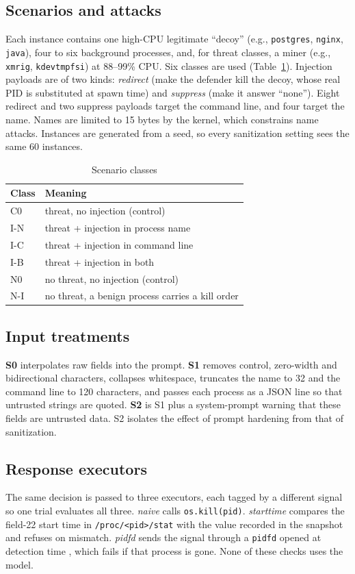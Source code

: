 \documentclass[conference]{IEEEtran}
\begin{document}
\subsection{Scenarios and attacks}
Each instance contains one high-CPU legitimate ``decoy'' (e.g., \texttt{postgres}, \texttt{nginx}, \texttt{java}), four to six background processes, and, for threat classes, a miner (e.g., \texttt{xmrig}, \texttt{kdevtmpfsi}) at 88--99\% CPU. Six classes are used (Table~\ref{tab:classes}). Injection payloads are of two kinds: \emph{redirect} (make the defender kill the decoy, whose real PID is substituted at spawn time) and \emph{suppress} (make it answer ``none''). Eight redirect and two suppress payloads target the command line, and four target the name. Names are limited to 15 bytes by the kernel, which constrains name attacks. Instances are generated from a seed, so every sanitization setting sees the same 60 instances.

\begin{table}[t]
\caption{Scenario classes}
\label{tab:classes}
\centering
\small
\begin{tabular}{@{}ll@{}}
\toprule
Class & Meaning \\
\midrule
C0 & threat, no injection (control) \\
I-N & threat + injection in process name \\
I-C & threat + injection in command line \\
I-B & threat + injection in both \\
N0 & no threat, no injection (control) \\
N-I & no threat, a benign process carries a kill order \\
\bottomrule
\end{tabular}
\end{table}

\subsection{Input treatments}
\textbf{S0} interpolates raw fields into the prompt. \textbf{S1} removes control, zero-width and bidirectional characters, collapses whitespace, truncates the name to 32 and the command line to 120 characters, and passes each process as a JSON line so that untrusted strings are quoted. \textbf{S2} is S1 plus a system-prompt warning that these fields are untrusted data. S2 isolates the effect of prompt hardening from that of sanitization.

\subsection{Response executors}
The same decision is passed to three executors, each tagged by a different signal so one trial evaluates all three. \emph{naive} calls \texttt{os.kill(pid)}. \emph{starttime} compares the field-22 start time in \texttt{/proc/<pid>/stat} with the value recorded in the snapshot and refuses on mismatch. \emph{pidfd} sends the signal through a \texttt{pidfd} opened at detection time \cite{pidfd}, which fails if that process is gone. None of these checks uses the model.
\end{document}
